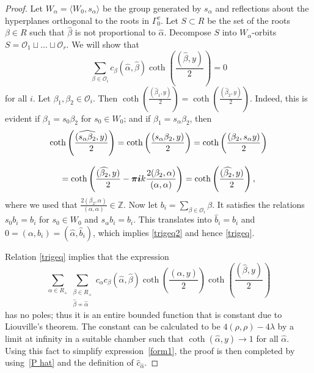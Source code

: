 \documentclass[12pt]{amsart}
\numberwithin{equation}{section}
\theoremstyle{definition}
\begin{document}
\begin{proof}
Let $W_{\alpha} = \langle W_0 , s_{\alpha} \rangle$ be the group generated by $s_{\alpha}$ and reflections about the hyperplanes orthogonal to the roots in $\Gamma_0^v$. Let $S \subset R$ be the set of the roots $\beta \in R$ such that $\widehat{\beta}$ is not proportional to $\widehat{\alpha}$. Decompose $S$ into $W_{\alpha}$-orbits $S = \mathcal{O}_1 \sqcup \dots \sqcup \mathcal{O}_r $.
We will show that
\begin{equation}
    \label{trigeq2}
    \sum\limits_{\beta \in \mathcal{O}_i} c_{\beta} (\widehat{\alpha}, \widehat{\beta}) \coth\left(\frac{(\widehat{\beta}, y)}{2}\right) = 0
\end{equation}
for all $i$. Let $\beta_1, \beta_2 \in \mathcal{O}_i$. Then $\coth(\frac{(\widehat{\beta}_1, y)}{2}) = \coth(\frac{(\widehat{\beta}_2, y)}{2})$. Indeed, this is evident if $\beta_1 = s_0 \beta_2$ for $s_0 \in W_0$; and if $\beta_1 = s_{\alpha} \beta_2$, then
\begin{equation*}
\begin{array}{c}
\displaystyle{
    \coth\left(\frac{(\widehat{s_{\alpha} \beta_2}, y)}{2}\right) = \coth\left(\frac{(s_{\alpha} \beta_2 , y)}{2}\right) = \coth\left(\frac{ (\beta_2 , s_{\alpha} y)}{2}\right) 
    }
    \\ \ \\
    \displaystyle{
     = \coth \left(\frac{(\widehat{\beta_2}, y)}{2} - \boldsymbol{\pi} \boldsymbol{i} k \frac{2 (\beta_2 , \alpha)}{(\alpha, \alpha)} \right) 
     = \coth \left(\frac{(\widehat{\beta_2}, y)}{2}\right),
    }
    \end{array}
\end{equation*}
where we used that $\frac{2 (\beta_2 , \alpha)}{(\alpha, \alpha)} \in \mathbb{Z}$. Now let
$
    b_i = \sum_{\beta \in \mathcal{O}_i} \beta.
$
It satisfies the relations $s_0 b_i = b_i$ for $s_0 \in W_0$ and $s_{\alpha} b_i = b_i$. This translates into $\widehat{b}_i = b_i$ and $0= (\alpha, b_i) = (\widehat{\alpha}, \widehat{b}_i)$, which implies \eqref{trigeq2} and hence \eqref{trigeq}. 

Relation \eqref{trigeq} implies that the expression
\begin{equation*}
   \sum_{\alpha \in R_+}
    \sum_{\substack{\beta \in R_+ \\  \widehat{\beta} \nsim \widehat{\alpha}}} c_{\alpha} c_{\beta} (\widehat{\alpha}, \widehat{\beta}) \coth\left(\frac{(\widehat{\alpha}, y)}{2}\right) \coth\left(\frac{(\widehat{\beta}, y)}{2}\right)
\end{equation*}
has no poles; thus it is an entire bounded function that is constant due to Liouville's theorem. The constant can be calculated to be $4 (\rho, \rho) - 4\lambda$ by a limit at infinity in a suitable chamber such that $\coth (\widehat{\alpha}, y) \to 1$ for all $\widehat{\alpha}$.
Using this fact to simplify expression~\eqref{form1}, the proof is then completed by using~\eqref{P hat} and the definition of $\widehat{c}_{\widehat{\alpha}}$.
\end{proof}
\end{document}

